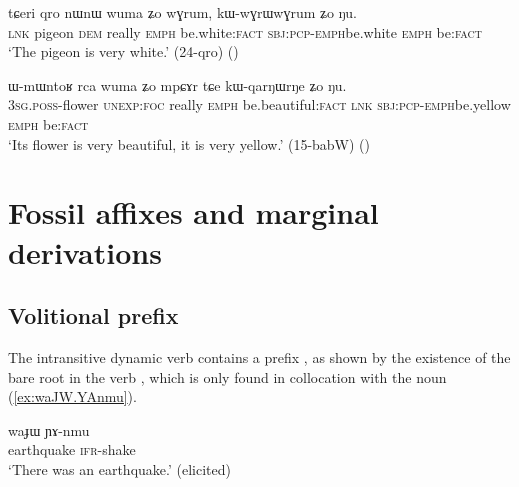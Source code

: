 \begin{exe}
\ex \label{ex:kWwGrWwGrum}
\gll  tɕeri qro nɯnɯ wuma ʑo wɣrum, kɯ-wɣrɯ\redp{}wɣrum ʑo ŋu. \\
\textsc{lnk} pigeon \textsc{dem} really \textsc{emph} be.white:\textsc{fact} \textsc{sbj}:\textsc{pcp}-\textsc{emph}\redp{}be.white \textsc{emph} be:\textsc{fact} \\
\glt `The pigeon is very white.' (24-qro) ()
\end {exe}

\begin{exe}
\ex \label{ex:kWqarNWrNe}
\gll ɯ-mɯntoʁ rca wuma ʑo mpɕɤr tɕe kɯ-qarŋɯ\redp{}rŋe ʑo ŋu. \\
\textsc{3sg}.\textsc{poss}-flower \textsc{unexp}:\textsc{foc} really \textsc{emph} be.beautiful:\textsc{fact} \textsc{lnk} \textsc{sbj}:\textsc{pcp}-\textsc{emph}\redp{}be.yellow \textsc{emph} be:\textsc{fact} \\
\glt `Its flower is very beautiful, it is very yellow.' (15-babW) ()
\end {exe}

\section{Fossil affixes and marginal derivations} \label{sec:marginal.derivations}


\subsection{Volitional  prefix} \label{sec:volitional.mW}
The intransitive dynamic verb  contains a prefix , as shown by the existence of the bare root  in the verb  \citep{jacques17volitional}, which is only found in collocation with the noun  (\ref{ex:waJW.YAnmu}).


\begin{exe}
\ex \label{ex:waJW.YAnmu}
\gll waɟɯ ɲɤ-nmu \\
earthquake \textsc{ifr}-shake \\
\glt `There was an earthquake.' (elicited)
\end{exe}

